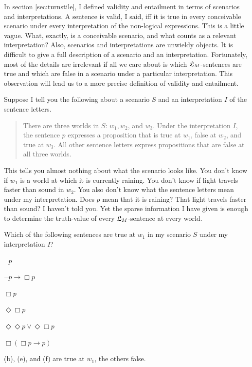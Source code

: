 In section \ref{sec:turnstile}, I defined validity and entailment in terms of
scenarios and interpretations. A sentence is valid, I said, iff it is true in
every conceivable scenario under every interpretation of the non-logical
expressions. This is a little vague. What, exactly, is a conceivable scenario,
and what counts as a relevant interpretation? Also, scenarios and
interpretations are unwieldy objects. It is difficult to give a full description
of a scenario and an interpretation. Fortunately, most of the details are
irrelevant if all we care about is which $\mathfrak{L}_{M}$-sentences are true and which
are false in a scenario under a particular interpretation. This observation will
lead us to a more precise definition of validity and entailment.

Suppose I tell you the following about a scenario $S$ and an interpretation $I$
of the sentence letters.

\begin{quote}
  There are three worlds in $S$: $w_{1}, w_{2}$, and $w_{3}$. Under the
  interpretation $I$, the sentence $p$ expresses a proposition that is true at
  $w_{1}$, false at $w_{2}$, and true at $w_{3}$. All other sentence letters
  express propositions that are false at all three worlds.
\end{quote}

This tells you almost nothing about what the scenario looks like. You don't know
if $w_{1}$ is a world at which it is currently raining. You don't know if light travels faster than sound in $w_{2}$. You also don't know what the sentence letters mean under
my interpretation. Does $p$ mean that it is raining? That light travels faster than sound? I haven't told you. Yet the sparse information I have given is
enough to determine the truth-value of every $\mathfrak{L}_{M}$-sentence at every world.

\begin{exercise}
  Which of the following sentences are true at $w_{1}$ in my scenario $S$ under
  my interpretation $I$?
  \begin{exlist}
  \item $\neg p$ %
  \item $\neg p \to \Box p$ %
  \item $\Box p$ %
  \item $\Diamond\Box p$ %
  \item $\Diamond \Diamond p \lor \Diamond \Box p$ %
  \item $\Box (\Box p \to p)$ %
  \end{exlist}
\end{exercise}
\begin{solution}
  (b), (e), and (f) are true at $w_{1}$, the others false.
\end{solution}

